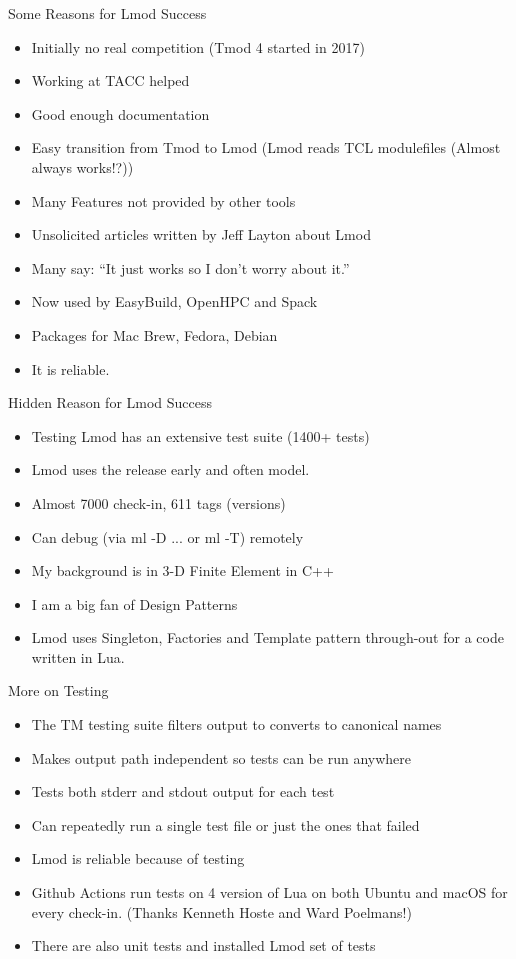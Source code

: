 \documentclass{beamer}
\begin{document}
\begin{frame}{Some Reasons for Lmod Success}
  \begin{itemize}
    \item Initially no real competition (Tmod 4 started in 2017)
    \item Working at TACC helped
    \item Good enough documentation
    \item Easy transition from Tmod to Lmod (Lmod reads TCL
      modulefiles (Almost always works!?))
    \item Many Features not provided by other tools
    \item Unsolicited articles written by Jeff Layton about Lmod
    \item Many say: ``It just works so I don't worry about it.''
    \item Now used by EasyBuild, OpenHPC and Spack
    \item Packages for Mac Brew, Fedora, Debian
    \item It is reliable.
  \end{itemize}
\end{frame}

\begin{frame}{Hidden Reason for Lmod Success}
  \begin{itemize}
    \item Testing Lmod has an extensive test suite (1400+ tests)
    \item Lmod uses the release early and often model.
    \item Almost 7000 check-in, 611 tags (versions)
    \item Can debug (via ml -D ... or ml -T) remotely
    \item My background is in 3-D Finite Element in C++
    \item I am a big fan of Design Patterns
    \item Lmod uses Singleton, Factories and Template pattern
      through-out for a code written in Lua.
  \end{itemize}
\end{frame}

\begin{frame}{More on Testing}
  \begin{itemize}
    \item The TM testing suite filters output to converts to canonical
      names
    \item Makes output path independent so tests can be run anywhere
    \item Tests both stderr and stdout output for each test
    \item Can repeatedly run a single test file or just the ones that
      failed
    \item Lmod is reliable because of testing
    \item Github Actions run tests on 4 version of Lua on both
      Ubuntu and macOS for every check-in. (Thanks Kenneth Hoste and
      Ward Poelmans!)
    \item There are also unit tests and installed Lmod set of tests
  \end{itemize}
\end{frame}
\end{document}
